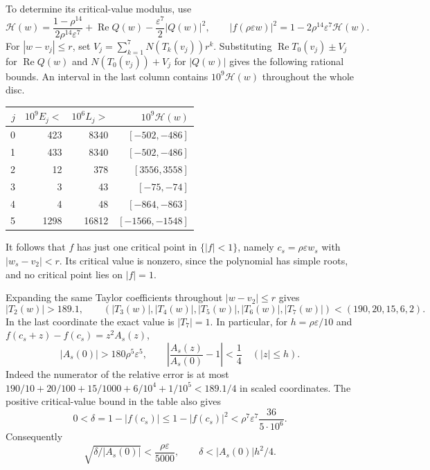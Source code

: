 \documentclass[11pt]{article}
\begin{document}
To determine its critical-value modulus, use
\[
 \mathscr H(w)=\frac{1-\rho^{14}}{2\rho^{14}\varepsilon^7}
       +\operatorname{Re}Q(w)-\frac{\varepsilon^7}{2}|Q(w)|^2,
 \qquad |f(\rho\varepsilon w)|^2
       =1-2\rho^{14}\varepsilon^7\mathscr H(w).
\]
For $|w-v_j|\le r$, set
$V_j=\sum_{k=1}^7N(T_k(v_j))r^k$. Substituting
$\operatorname{Re}T_0(v_j)\pm V_j$ for $\operatorname{Re}Q(w)$ and
$N(T_0(v_j))+V_j$ for $|Q(w)|$ gives the following rational bounds.
An interval in the last column contains $10^9\mathscr H(w)$ throughout
the whole disc.
\begin{center}
\begin{tabular}{@{}rrrr@{}}
\toprule
$j$&$10^9 E_j<$&$10^6 L_j>$&$10^9\mathscr H(w)$\\
\midrule
0&423&8340&$[-502,-486]$\\
1&433&8340&$[-502,-486]$\\
2&12&378&$[3556,3558]$\\
3&3&43&$[-75,-74]$\\
4&4&48&$[-864,-863]$\\
5&1298&16812&$[-1566,-1548]$\\
\bottomrule
\end{tabular}
\end{center}
It follows that $f$ has just one critical point in $\{|f|<1\}$, namely
$c_s=\rho\varepsilon w_s$ with $|w_s-v_2|<r$. Its critical value is
nonzero, since the polynomial has simple roots, and no critical point
lies on $|f|=1$.

Expanding the same Taylor coefficients throughout $|w-v_2|\le r$ gives
\[
 |T_2(w)|>189.1,\qquad
 (|T_3(w)|,|T_4(w)|,|T_5(w)|,|T_6(w)|,|T_7(w)|)
 <(190,20,15,6,2).
\]
In the last coordinate the exact value is $|T_7|=1$. In particular, for
$h=\rho\varepsilon/10$ and
$f(c_s+z)-f(c_s)=z^2A_s(z)$,
\begin{equation}\label{eq:counterexample-local-bounds}
 |A_s(0)|>180\rho^5\varepsilon^5,
 \qquad
 \left|\frac{A_s(z)}{A_s(0)}-1\right|<\frac14\quad(|z|\le h).
\end{equation}
Indeed the numerator of the relative error is at most
$190/10+20/100+15/1000+6/10^4+1/10^5<189.1/4$ in scaled
coordinates. The positive critical-value bound in the table also gives
\[
 0<\delta=1-|f(c_s)|
 \le 1-|f(c_s)|^2
 <\rho^7\varepsilon^7\frac{36}{5\cdot10^6}.
\]
Consequently
\begin{equation}\label{eq:counterexample-radius}
 \sqrt{\delta/|A_s(0)|}<\frac{\rho\varepsilon}{5000},
 \qquad \delta<|A_s(0)|h^2/4.
\end{equation}
\end{document}
